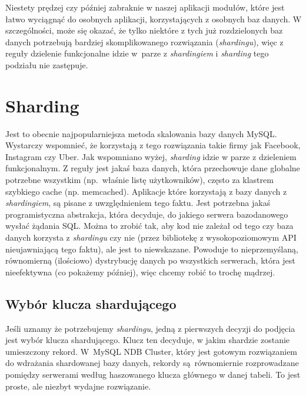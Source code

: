 \documentclass[a4paper,12pt]{article}
\begin{document}
Niestety prędzej czy później zabraknie w naszej aplikacji modułów, które jest łatwo wyciągnąć do osobnych aplikacji, korzystających z osobnych baz danych. W szczególności, może się okazać, że tylko niektóre z tych już rozdzielonych baz danych potrzebują bardziej skomplikowanego rozwiązania (\textit{shardingu}), więc z reguły dzielenie funkcjonalne idzie w~parze z \textit{shardingiem} i \textit{sharding} tego podziału nie zastępuje.

\section{Sharding}

Jest to obecnie najpopularniejsza metoda skalowania bazy danych MySQL. Wystarczy wspomnieć, że korzystają z tego rozwiązania takie firmy jak Facebook, Instagram czy Uber. Jak wspomniano wyżej, \textit{sharding} idzie w parze z dzieleniem funkcjonalnym. Z reguły jest jakaś baza danych, która przechowuje dane globalne potrzebne wszystkim (np.~właśnie listę użytkowników), często za klastrem szybkiego cache (np. memcached). Aplikacje które korzystają z bazy danych z \textit{shardingiem}, są pisane z uwzględnieniem tego faktu. Jest potrzebna jakaś programistyczna abstrakcja, która decyduje, do jakiego serwera bazodanowego wysłać żądania SQL. Można to zrobić tak, aby kod nie zależał od tego czy baza danych korzysta z \textit{shardingu} czy nie (przez bibliotekę z wysokopoziomowym API nieujawniającą tego faktu), ale jest to niewskazane. Powoduje to nieprzemyślaną, równomierną (ilościowo) dystrybucję danych po wszystkich serwerach, która jest nieefektywna (co pokażemy później), więc chcemy robić to trochę mądrzej.

\subsection{Wybór klucza shardującego}

Jeśli uznamy że potrzebujemy \textit{shardingu}, jedną z pierwszych decyzji do podjęcia jest wybór klucza shardującego. Klucz ten decyduje, w jakim shardzie zostanie umieszczony rekord. W~MySQL NDB Cluster, który jest gotowym rozwiązaniem do wdrażania shardowanej bazy danych, rekordy są równomiernie rozprowadzane pomiędzy serwerami według haszowanego klucza głównego w danej tabeli. To jest proste, ale niezbyt wydajne rozwiązanie.
\end{document}
